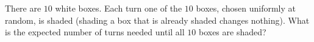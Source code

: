 There are $10$ white boxes. Each turn one of the $10$ boxes, chosen uniformly at random, is shaded (shading a box that is already shaded changes nothing). What is the expected number of turns needed until all $10$ boxes are shaded?
